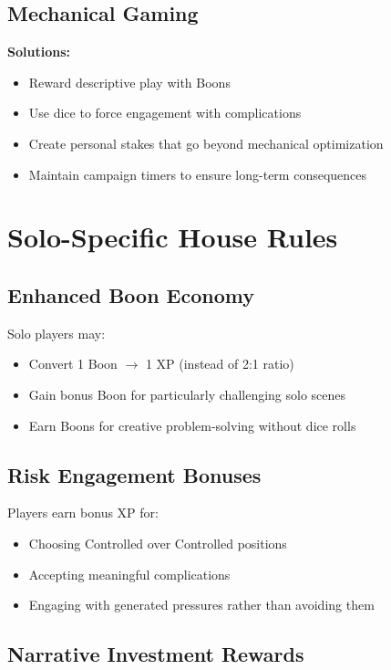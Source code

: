 \documentclass[11pt]{article}
\begin{document}
\subsection{Mechanical Gaming}

\begin{framed}
\textbf{Solutions:}
\begin{itemize}
    \item Reward descriptive play with Boons
    \item Use dice to force engagement with complications
    \item Create personal stakes that go beyond mechanical optimization
    \item Maintain campaign timers to ensure long-term consequences
\end{itemize}
\end{framed}

\section{Solo-Specific House Rules}

\subsection{Enhanced Boon Economy}

Solo players may:
\begin{itemize}
    \item Convert 1 Boon $\rightarrow$ 1 XP (instead of 2:1 ratio)
    \item Gain bonus Boon for particularly challenging solo scenes
    \item Earn Boons for creative problem-solving without dice rolls
\end{itemize}

\subsection{Risk Engagement Bonuses}

Players earn bonus XP for:
\begin{itemize}
    \item Choosing Controlled over Controlled positions
    \item Accepting meaningful complications
    \item Engaging with generated pressures rather than avoiding them
\end{itemize}

\subsection{Narrative Investment Rewards}
\end{document}
